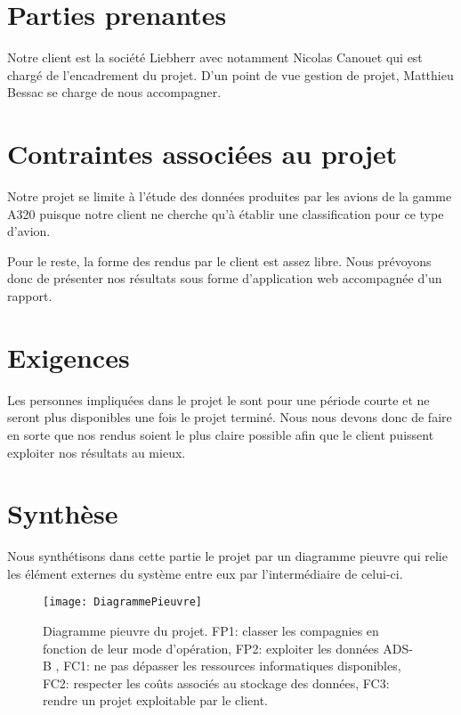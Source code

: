 \section*{Parties prenantes}
Notre client est la société Liebherr avec notamment Nicolas Canouet qui est chargé de l'encadrement du projet. D'un point de vue gestion de projet, Matthieu Bessac se charge de nous accompagner.

\section*{Contraintes associées au projet}
Notre projet se limite à l'étude des données produites par les avions de la gamme A320 puisque notre client ne cherche qu'à établir une classification pour ce type d'avion.

Pour le reste, la forme des rendus par le client est assez libre. Nous prévoyons donc de présenter nos résultats sous forme d'application web accompagnée d'un rapport.

\section*{Exigences}
Les personnes impliquées dans le projet le sont pour une période courte et ne seront plus disponibles une fois le projet terminé. Nous nous devons donc de faire en sorte que nos rendus soient le plus claire possible afin que le client puissent exploiter nos résultats au mieux.

\section*{Synthèse}
Nous synthétisons dans cette partie le projet par un diagramme pieuvre qui relie les élément externes du système entre eux par l'intermédiaire de celui-ci.

\begin{figure}[!ht]
	\centering
	\texttt{[image: DiagrammePieuvre]}
	\caption{
		Diagramme pieuvre du projet. FP1: classer les compagnies
		en fonction de leur mode d'opération, FP2: exploiter les données ADS-B
		, FC1: ne pas dépasser les ressources informatiques disponibles,
		FC2: respecter les coûts associés au stockage des données,
		FC3: rendre un projet exploitable par le client.
	}
	\label{fig:pieuvre}
\end{figure}

